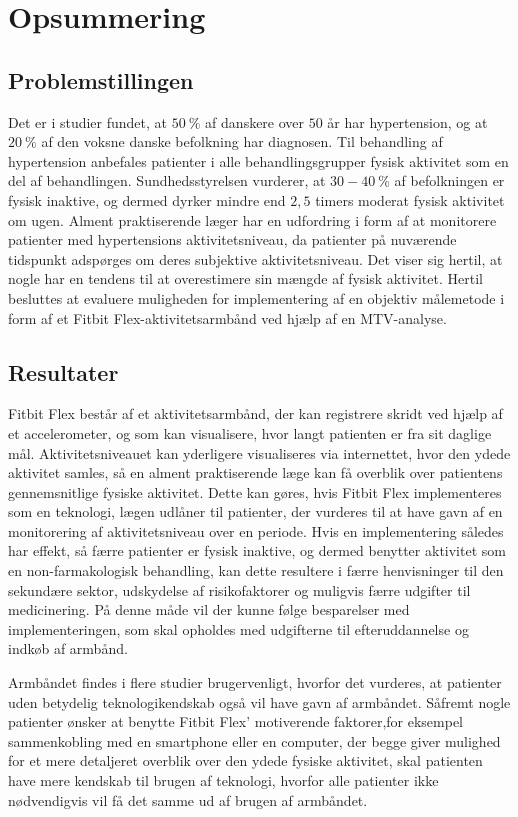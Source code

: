 \section{Opsummering}
\subsection{Problemstillingen}
Det er i studier fundet, at $50~\%$ af danskere over $50$ år har hypertension, og at $20~\%$ af den voksne danske befolkning har diagnosen. Til behandling af hypertension anbefales patienter i alle behandlingsgrupper fysisk aktivitet som en del af behandlingen. Sundhedsstyrelsen vurderer, at $30-40~\%$ af befolkningen er fysisk inaktive, og dermed dyrker mindre end $2,5$ timers moderat fysisk aktivitet om ugen. Alment praktiserende læger har en udfordring i form af at monitorere patienter med hypertensions aktivitetsniveau, da patienter på nuværende tidspunkt adspørges om deres subjektive aktivitetsniveau. Det viser sig hertil, at nogle har en tendens til at overestimere sin mængde af fysisk aktivitet. Hertil besluttes at evaluere muligheden for implementering af en objektiv målemetode i form af et Fitbit Flex-aktivitetsarmbånd ved hjælp af en MTV-analyse. 
\subsection{Resultater}
Fitbit Flex består af et aktivitetsarmbånd, der kan registrere skridt ved hjælp af et accelerometer, og som kan visualisere, hvor langt patienten er fra sit daglige mål. Aktivitetsniveauet kan yderligere visualiseres via internettet, hvor den ydede aktivitet samles, så en alment praktiserende læge kan få overblik over patientens gennemsnitlige fysiske aktivitet. Dette kan gøres, hvis Fitbit Flex implementeres som en teknologi, lægen udlåner til patienter, der vurderes til at have gavn af en monitorering af aktivitetsniveau over en periode. Hvis en implementering således har effekt, så færre patienter er fysisk inaktive, og dermed benytter aktivitet som en non-farmakologisk behandling, kan dette resultere i færre henvisninger til den sekundære sektor, udskydelse af risikofaktorer og muligvis færre udgifter til medicinering. På denne måde vil der kunne følge besparelser med implementeringen, som skal opholdes med udgifterne til efteruddannelse og indkøb af armbånd. 

Armbåndet findes i flere studier brugervenligt, hvorfor det vurderes, at patienter uden betydelig teknologikendskab også vil have gavn af armbåndet. Såfremt nogle patienter ønsker at benytte Fitbit Flex' motiverende faktorer,for eksempel sammenkobling med en smartphone eller en computer, der begge giver mulighed for et mere detaljeret overblik over den ydede fysiske aktivitet, skal patienten have mere kendskab til brugen af teknologi, hvorfor alle patienter ikke nødvendigvis vil få det samme ud af brugen af armbåndet.